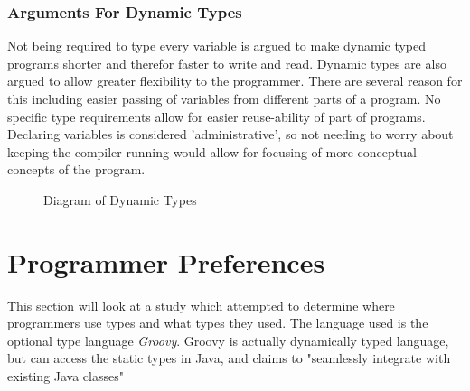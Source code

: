 \documentclass{sig-alternate}
\begin{document}
\subsubsection{Arguments For Dynamic Types}
Not being required to type every variable is argued to make dynamic typed programs shorter and therefor faster to write and read. Dynamic types are also argued to allow greater flexibility to the programmer. There are several reason for this including easier passing of variables from different parts of a program. No specific type requirements allow for easier reuse-ability of part of programs. Declaring variables is considered 'administrative', so not needing to worry about keeping the compiler running would allow for focusing of more conceptual concepts of the program.

\begin{figure}
\centering
{}
\caption{Diagram of Dynamic Types \cite{Ferg2012}}
\end{figure}

\section{Programmer Preferences} \label{programmers}
This section will look at a study which attempted to determine where programmers use types and what types they used. The language used is the optional type language \emph{Groovy}. Groovy is actually dynamically typed language, but can access the static types in Java, and claims to "seamlessly integrate with existing Java classes" \cite{Souza2014}
\end{document}
